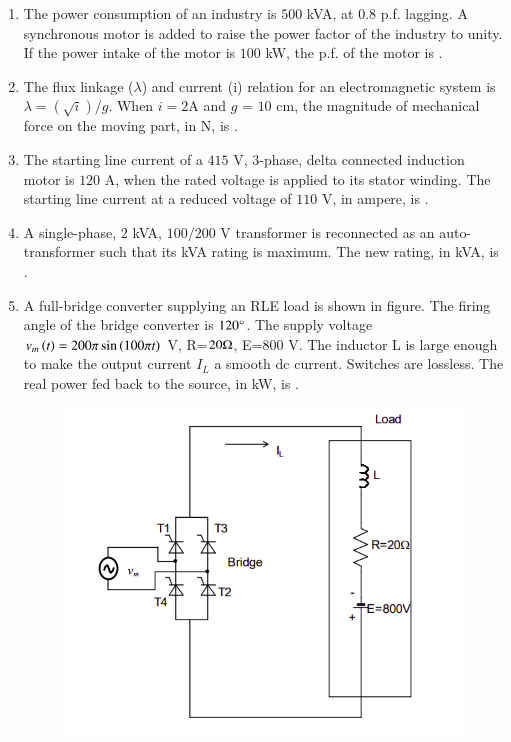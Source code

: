 \documentclass[journal,12pt,onecolumn]{IEEEtran}
\theoremstyle{remark}
\begin{document}
\begin{enumerate}[start=1, label=Q.\arabic*]
    \hfill{}

    \item The power consumption of an industry is $500$ kVA, at $0.8$ p.f. lagging. A synchronous motor is added to raise the power factor of the industry to unity. If the power intake of the motor is $100$ kW, the p.f. of the motor is \underline{\hspace{2cm}}.

    \hfill{}

    \item The flux linkage ($\lambda$) and current (i) relation for an electromagnetic system is $\lambda = (\sqrt{i})/g$. When $i=2$A and $g$  = $10$ cm, the magnitude of mechanical force on the moving part, in N, is \underline{\hspace{2cm}}.

    \hfill{}

    \item The starting line current of a $415$ V, 3-phase, delta connected induction motor is $120$ A, when the rated voltage is applied to its stator winding. The starting line current at a reduced voltage of $110$ V, in ampere, is \underline{\hspace{2cm}}.

    \hfill{}

    \item A single-phase, $2$ kVA, $100/200$ V transformer is reconnected as an auto-transformer such that its kVA rating is maximum. The new rating, in kVA, is \underline{\hspace{2cm}}.

    \hfill{}

    \item A full-bridge converter supplying an RLE load is shown in figure. The firing angle of the bridge converter is $120\degree$. The supply voltage $v_m\left(t\right) = 200\pi \sin\left(100\pi t\right)$ V, R=$20\ohm$, E=$800$ V. The inductor L is large enough to make the output current $I_L$ a smooth dc current. Switches are lossless. The real power fed back to the source, in kW, is \underline{\hspace{2cm}}.
    \begin{figure}[H]
        \includegraphics[width=0.6\columnwidth]{Figures/2q45.png}
        \centering
        \caption{}
    \end{figure}


\end{enumerate}
\end{document}
